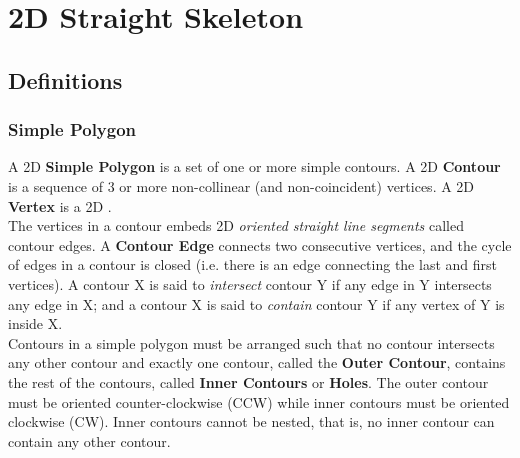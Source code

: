 
\chapter{2D Straight Skeleton}
\label{chapter-straightskeleton2}

\section{Definitions}

\subsection{Simple Polygon}

A 2D \textbf{Simple Polygon} is a set of one or more simple contours. A 2D \textbf{Contour} is a sequence of 3 or more non-collinear (and non-coincident) vertices. A 2D \textbf{Vertex} is a 2D .\\
The vertices in a contour embeds 2D \textit{oriented straight line segments} called contour edges. A \textbf{Contour Edge} connects two consecutive vertices, and the cycle of edges in a contour is closed (i.e. there is an edge connecting the last and first vertices). A contour X is said to \textit{intersect} contour Y if any edge in Y intersects any edge in X; and a contour X is said to \textit{contain} contour Y if any vertex of Y is inside X.\\
Contours in a simple polygon must be arranged such that no contour intersects any other contour and exactly one contour, called the \textbf{Outer Contour}, contains the rest of the contours, called \textbf{Inner Contours} or \textbf{Holes}. The outer contour must be oriented counter-clockwise (CCW) while inner contours must be oriented clockwise (CW). Inner contours cannot be nested, that is, no inner contour can contain any other contour.

